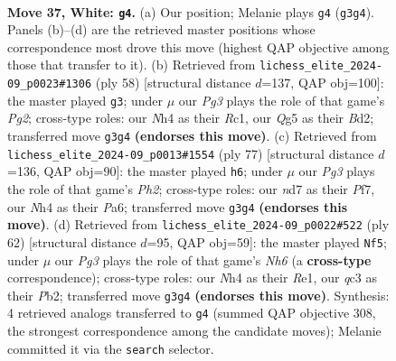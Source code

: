 \documentclass[11pt]{article}
\begin{document}
\clearpage

\begin{figure}[p]\centering
\begin{subfigure}{0.46\textwidth}\centering
\resizebox{\linewidth}{!}{%
\newchessgame
\chessboard[
  setfen={2r3k1/3n2p1/1p3n2/r2p2Qp/P3p2N/2q3P1/2P2P1P/R2R1K2 w - - 0 37},
  showmover=false,
  pgfstyle=straightmove, color=movearrow, markmove={g3-g4}
]}
\caption{}
\end{subfigure}\hfill
\begin{subfigure}{0.46\textwidth}\centering
\resizebox{\linewidth}{!}{%
\newchessgame
\chessboard[
  setfen={rr4k1/2q3pp/2P1np2/Pp2p3/4Qn2/5N2/3B1PPP/R1R3K1 w - - 1 30},
  showmover=false,
  pgfstyle=straightmove, color=movearrow, markmove={g2-g3}
]}
\caption{}
\end{subfigure}
\\[4pt]
\begin{subfigure}{0.46\textwidth}\centering
\resizebox{\linewidth}{!}{%
\newchessgame
\chessboard[
  setfen={2r1r3/2q2pkp/p5p1/PpNbP1Qn/3P1PP1/1Np4P/8/3RR1K1 b - - 0 39},
  showmover=false,
  pgfstyle=straightmove, color=movearrow, markmove={h7-h6}
]}
\caption{}
\end{subfigure}\hfill
\begin{subfigure}{0.46\textwidth}\centering
\resizebox{\linewidth}{!}{%
\newchessgame
\chessboard[
  setfen={r4r1k/1p3p2/1p1nq1nN/2p3QP/4P3/2pP4/PP4P1/4RRK1 w - - 7 32},
  showmover=false,
  pgfstyle=straightmove, color=movearrow, markmove={h6-f5}
]}
\caption{}
\end{subfigure}
\caption{\textbf{Move 37, White: \texttt{g4}.} (a) Our position; Melanie plays \texttt{g4} (\texttt{g3g4}). Panels (b)--(d) are the retrieved master positions whose correspondence most drove this move (highest QAP objective among those that transfer to it). (b) Retrieved from \texttt{lichess\_elite\_2024-09\_p0023\#1306} (ply 58) [structural distance $d$=137, QAP obj=100]: the master played \texttt{g3}; under $\mu$ our \emph{Pg3} plays the role of that game's \emph{Pg2}; cross-type roles: our \emph{N}h4 as their \emph{R}c1, our \emph{Q}g5 as their \emph{B}d2; transferred move \texttt{g3g4} \textbf{(endorses this move)}. (c) Retrieved from \texttt{lichess\_elite\_2024-09\_p0013\#1554} (ply 77) [structural distance $d$=136, QAP obj=90]: the master played \texttt{h6}; under $\mu$ our \emph{Pg3} plays the role of that game's \emph{Ph2}; cross-type roles: our \emph{n}d7 as their \emph{P}f7, our \emph{N}h4 as their \emph{P}a6; transferred move \texttt{g3g4} \textbf{(endorses this move)}. (d) Retrieved from \texttt{lichess\_elite\_2024-09\_p0022\#522} (ply 62) [structural distance $d$=95, QAP obj=59]: the master played \texttt{Nf5}; under $\mu$ our \emph{Pg3} plays the role of that game's \emph{Nh6} (a \textbf{cross-type} correspondence); cross-type roles: our \emph{N}h4 as their \emph{R}e1, our \emph{q}c3 as their \emph{P}b2; transferred move \texttt{g3g4} \textbf{(endorses this move)}. Synthesis: 4 retrieved analogs transferred to \texttt{g4} (summed QAP objective 308, the strongest correspondence among the candidate moves); Melanie committed it via the \texttt{search} selector.}
\label{fig:thought-m72}
\end{figure}
\end{document}
